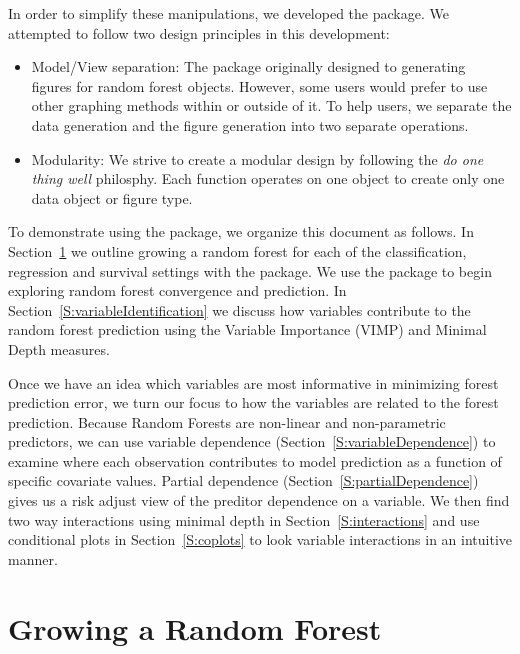 \documentclass[nojss,letterpaper]{jss}\usepackage[]{graphicx}\usepackage[]{color}
\begin{document}
In order to simplify these manipulations, we developed the  package. We attempted to follow two design principles in this development:
\begin{itemize}
\item Model/View separation: The package originally designed to generating ~\cite{Wickham2009} figures for random forest objects. However, some users would prefer to use other graphing methods within  or outside of it. To help users, we separate the data generation and the figure generation into two separate operations. 

\item Modularity: We strive to create a modular design by following the \emph{do one thing well} philosphy. Each function operates on one  object to create only one data object or figure type.
\end{itemize}

To demonstrate using the  package, we organize this document as follows. In Section~\ref{S:rfsrcGrow} we outline growing a random forest for each of the classification, regression and survival settings with the  package. We use the  package to begin exploring random forest convergence and prediction. In Section~\ref{S:variableIdentification} we discuss how variables contribute to the random forest prediction using the Variable Importance (VIMP) and Minimal Depth measures.

Once we have an idea which variables are most informative in minimizing forest prediction error, we turn our focus to how the variables are related to the forest prediction. Because Random Forests are non-linear and non-parametric predictors, we can use variable dependence (Section~\ref{S:variableDependence}) to examine where each observation contributes to model prediction as a function of specific covariate values. Partial dependence (Section~\ref{S:partialDependence}) gives us a risk adjust view of the preditor dependence on a variable. We then find two way interactions using minimal depth in Section~\ref{S:interactions} and use conditional plots in Section~\ref{S:coplots} to look variable interactions in an intuitive manner.

\section{Growing a Random Forest}\label{S:rfsrcGrow}
\end{document}
